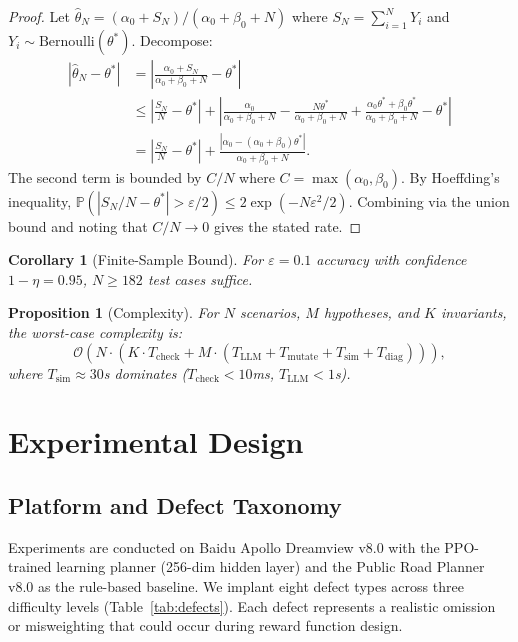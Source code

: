 \documentclass[journal]{IEEEtran}
\theoremstyle{plain}
\newtheorem{corollary}{Corollary}[section]
\newtheorem{proposition}{Proposition}[section]
\newcommand{\Prob}{\mathbb{P}}
\begin{document}
\begin{proof}
Let $\hat{\theta}_N = (\alpha_0 + S_N)/(\alpha_0 + \beta_0 + N)$ where $S_N = \sum_{i=1}^N Y_i$ and $Y_i \sim \text{Bernoulli}(\theta^*)$. Decompose:
\begin{align}
|\hat{\theta}_N - \theta^*| &= \left|\frac{\alpha_0 + S_N}{\alpha_0 + \beta_0 + N} - \theta^*\right| \\
&\leq \left|\frac{S_N}{N} - \theta^*\right| + \left|\frac{\alpha_0}{\alpha_0+\beta_0+N} - \frac{N\theta^*}{\alpha_0+\beta_0+N} + \frac{\alpha_0\theta^* + \beta_0\theta^*}{\alpha_0+\beta_0+N} - \theta^*\right| \\
&= \left|\frac{S_N}{N} - \theta^*\right| + \frac{|\alpha_0 - (\alpha_0+\beta_0)\theta^*|}{\alpha_0+\beta_0+N}.
\end{align}
The second term is bounded by $C/N$ where $C = \max(\alpha_0, \beta_0)$. By Hoeffding's inequality, $\Prob(|S_N/N - \theta^*| > \varepsilon/2) \leq 2\exp(-N\varepsilon^2/2)$. Combining via the union bound and noting that $C/N \to 0$ gives the stated rate.
\end{proof}

\begin{corollary}[Finite-Sample Bound]\label{cor:sample}
For $\varepsilon = 0.1$ accuracy with confidence $1-\eta = 0.95$, $N \geq 182$ test cases suffice.
\end{corollary}

\begin{proposition}[Complexity]\label{prop:complexity}
For $N$ scenarios, $M$ hypotheses, and $K$ invariants, the worst-case complexity is:
\begin{equation}
\mathcal{O}(N \cdot (K \cdot T_{\text{check}} + M \cdot (T_{\text{LLM}} + T_{\text{mutate}} + T_{\text{sim}} + T_{\text{diag}}))),
\end{equation}
where $T_{\text{sim}} \approx 30$s dominates ($T_{\text{check}} < 10$ms, $T_{\text{LLM}} < 1$s).
\end{proposition}

\section{Experimental Design}

\subsection{Platform and Defect Taxonomy}

Experiments are conducted on Baidu Apollo Dreamview v8.0 with the PPO-trained learning planner (256-dim hidden layer) and the Public Road Planner v8.0 as the rule-based baseline. We implant eight defect types across three difficulty levels (Table~\ref{tab:defects}). Each defect represents a realistic omission or misweighting that could occur during reward function design.
\end{document}
